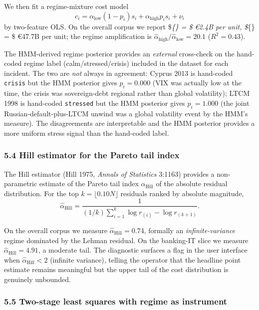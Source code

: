 \documentclass[
]{article}
\begin{document}
We then fit a regime-mixture cost model \[
c_i = \alpha_{\text{low}} (1 - p_i) s_i + \alpha_{\text{high}} p_i s_i + \nu_i
\] by two-feature OLS. On the overall corpus we report
\$\hat{\alpha}\emph{\{\} = \$ €2.4B per unit,
\$\hat{\alpha}}\{\} = \$ €47.7B per unit; the regime
amplification is
\(\hat{\alpha}_{\text{high}} / \hat{\alpha}_{\text{low}} = 20.1\)
(\(R^2 = 0.43\)).

The HMM-derived regime posterior provides an \emph{external} cross-check
on the hand-coded regime label (calm/stressed/crisis) included in the
dataset for each incident. The two are \emph{not} always in agreement:
Cyprus 2013 is hand-coded \texttt{crisis} but the HMM posterior gives
\(p_i = 0.000\) (VIX was actually low at the time, the crisis was
sovereign-debt regional rather than global volatility); LTCM 1998 is
hand-coded \texttt{stressed} but the HMM posterior gives \(p_i = 1.000\)
(the joint Russian-default-plus-LTCM unwind was a global volatility
event by the HMM's measure). The disagreements are interpretable and the
HMM posterior provides a more uniform stress signal than the hand-coded
label.

\subsubsection{5.4 Hill estimator for the Pareto tail
index}\label{hill-estimator-for-the-pareto-tail-index}

The Hill estimator (Hill 1975, \emph{Annals of Statistics} 3:1163)
provides a non-parametric estimate of the Pareto tail index
\(\alpha_{\text{Hill}}\) of the absolute residual distribution. For the
top \(k = \lfloor 0.10 N \rfloor\) residuals ranked by absolute
magnitude, \[
\hat{\alpha}_{\text{Hill}} = \frac{1}{(1/k) \sum_{i=1}^{k} \log r_{(i)} - \log r_{(k+1)}}.
\]

On the overall corpus we measure \(\hat{\alpha}_{\text{Hill}} = 0.74\),
formally an \emph{infinite-variance} regime dominated by the Lehman
residual. On the banking-IT slice we measure
\(\hat{\alpha}_{\text{Hill}} = 4.91\), a moderate tail. The diagnostic
surfaces a flag in the user interface when
\(\hat{\alpha}_{\text{Hill}} < 2\) (infinite variance), telling the
operator that the headline point estimate remains meaningful but the
upper tail of the cost distribution is genuinely unbounded.

\subsubsection{5.5 Two-stage least squares with regime as
instrument}\label{two-stage-least-squares-with-regime-as-instrument}
\end{document}
